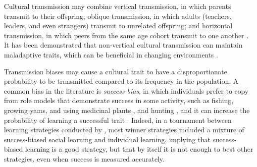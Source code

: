 \documentclass[12pt]{extarticle}
\begin{document}
Cultural transmission may combine vertical transmission, in which parents transmit to their offspring; oblique transmission, in which adults (teachers, leaders, and even strangers) transmit to unrelated offspring; and horizontal transmission, in which peers from the same age cohort transmit to one another \citep{transmissionVectorsBook,transmissionVectors}.
It has been demonstrated that non-vertical cultural transmission can maintain maladaptive traits, which can be beneficial in changing environments \citep{changeEnv}. 

Transmission biases may cause a cultural trait to have a disproportionate probability to be transmitted compared to its frequency in the population.
A common bias in the literature is \textit{success bias}, in which individuals prefer to copy from role models that demonstrate success in some activity, such as fishing, growing yams, and using medicinal plants \citep{fijian_social_bias}, and hunting \citep{Mesoudi2008}, and it can increase the probability of learning a successful trait \citep{Borofsky2022}. 
Indeed, in a tournament between learning strategies conducted by \citet{strategiesPaper}, most winner strategies included a mixture of success-biased social learning and individual learning, implying that success-biased learning is a good strategy, but that by itself it is not enough to best other strategies, even when success is measured accurately.
\end{document}
